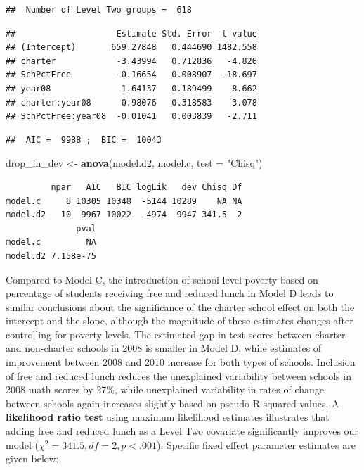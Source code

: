 \documentclass[
]{krantz}
\newenvironment{Shaded}{\begin{snugshade}}{\end{snugshade}}
\newcommand{\DataTypeTok}[1]{\textcolor[rgb]{0.27,0.27,0.27}{#1}}
\newcommand{\KeywordTok}[1]{\textcolor[rgb]{0.27,0.27,0.27}{\textbf{#1}}}
\newcommand{\NormalTok}[1]{#1}
\newcommand{\StringTok}[1]{\textcolor[rgb]{0.5,0.5,0.5}{#1}}
\begin{document}
\begin{verbatim}
##  Number of Level Two groups =  618
\end{verbatim}

\begin{verbatim}
##                    Estimate Std. Error  t value
## (Intercept)       659.27848   0.444690 1482.558
## charter            -3.43994   0.712836   -4.826
## SchPctFree         -0.16654   0.008907  -18.697
## year08              1.64137   0.189499    8.662
## charter:year08      0.98076   0.318583    3.078
## SchPctFree:year08  -0.01041   0.003839   -2.711
\end{verbatim}

\begin{verbatim}
##  AIC =  9988 ;  BIC =  10043
\end{verbatim}

\begin{Shaded}
\begin{Highlighting}[]
\NormalTok{drop_in_dev <-}\StringTok{ }\KeywordTok{anova}\NormalTok{(model.d2, model.c, }\DataTypeTok{test =} \StringTok{"Chisq"}\NormalTok{)}
\end{Highlighting}
\end{Shaded}

\begin{verbatim}
         npar   AIC   BIC logLik   dev Chisq Df
model.c     8 10305 10348  -5144 10289    NA NA
model.d2   10  9967 10022  -4974  9947 341.5  2
              pval
model.c         NA
model.d2 7.158e-75
\end{verbatim}

Compared to Model C, the introduction of school-level poverty based on percentage of students receiving free and reduced lunch in Model D leads to similar conclusions about the significance of the charter school effect on both the intercept and the slope, although the magnitude of these estimates changes after controlling for poverty levels. The estimated gap in test scores between charter and non-charter schools in 2008 is smaller in Model D, while estimates of improvement between 2008 and 2010 increase for both types of schools. Inclusion of free and reduced lunch reduces the unexplained variability between schools in 2008 math scores by 27\%, while unexplained variability in rates of change between schools again increases slightly based on pseudo R-squared values. A \textbf{likelihood ratio test} using maximum likelihood estimates illustrates that adding free and reduced lunch as a Level Two covariate significantly improves our model (\(\chi^2 = 341.5, df=2, p<.001\)). Specific fixed effect parameter estimates are given below:
\end{document}
